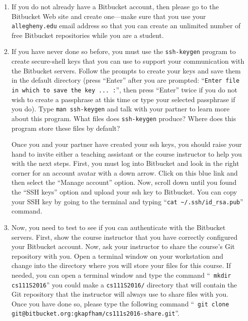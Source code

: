 \begin{enumerate}

  \item If you do not already have a Bitbucket account, then please go to the Bitbucket Web site and create one---make sure
    that you use your {\tt allegheny.edu} email address so that you can create an unlimited number of free Bitbucket
    repositories while you are a student.

  \item If you have never done so before, you must use the {\tt ssh-keygen} program to create secure-shell keys that you
    can use to support your communication with the Bitbucket servers. Follow the prompts to create your keys and save
    them in the default directory (press ``Enter'' after you are prompted: ``{\tt Enter file in which to save the key ...
    :}'', then press ``Enter'' twice if you do not wish to create a passphrase at this time or type your selected
    passphrase if you do).   Type {\tt man ssh-keygen} and talk with your partner to learn more about this program.
    What files does {\tt ssh-keygen} produce?  Where does this program store these files by default?

    Once you and your partner have created your ssh keys, you should raise your hand to invite either a teaching
    assistant or the course instructor to help you with the next steps. First, you must log into Bitbucket and look in the
    right corner for an account avatar with a down arrow.  Click on this blue link and then select the ``Manage
    account'' option. Now, scroll down until you found the ``SSH keys'' option and upload your ssh key to Bitbucket. You
    can copy your SSH key by going to the terminal and typing ``{\tt cat \textasciitilde{}/.ssh/id\_rsa.pub}'' command.

  \item Now, you need to test to see if you can authenticate with the Bitbucket servers.  First, show the course
    instructor that you have correctly configured your Bitbucket account.  Now, ask your instructor to share the
    course's Git repository with you.  Open a terminal window on your workstation and change into the directory where
    you will store your files for this course.  If needed, you can open a terminal window and type the command ``{\tt
    mkdir cs111S2016}'' you could make a {\tt cs111S2016/} directory that will contain the Git repository that the
    instructor will always use to share files with you.  Once you have done so, please type the following command ``{\tt
    git clone git@bitbucket.org:gkapfham/cs111s2016-share.git}''.


\end{enumerate}
